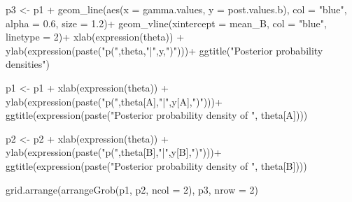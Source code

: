 \documentclass[
  11pt,
]{article}
\newenvironment{Shaded}{\begin{snugshade}}{\end{snugshade}}
\newcommand{\AttributeTok}[1]{\textcolor[rgb]{0.77,0.63,0.00}{#1}}
\newcommand{\DecValTok}[1]{\textcolor[rgb]{0.00,0.00,0.81}{#1}}
\newcommand{\FloatTok}[1]{\textcolor[rgb]{0.00,0.00,0.81}{#1}}
\newcommand{\FunctionTok}[1]{\textcolor[rgb]{0.00,0.00,0.00}{#1}}
\newcommand{\NormalTok}[1]{#1}
\newcommand{\OtherTok}[1]{\textcolor[rgb]{0.56,0.35,0.01}{#1}}
\newcommand{\SpecialCharTok}[1]{\textcolor[rgb]{0.00,0.00,0.00}{#1}}
\newcommand{\StringTok}[1]{\textcolor[rgb]{0.31,0.60,0.02}{#1}}
\begin{document}
\begin{Shaded}
\begin{Highlighting}[]
\NormalTok{p3 }\OtherTok{\textless{}{-}}\NormalTok{ p1 }\SpecialCharTok{+} 
  \FunctionTok{geom\_line}\NormalTok{(}\FunctionTok{aes}\NormalTok{(}\AttributeTok{x =}\NormalTok{ gamma.values, }\AttributeTok{y =}\NormalTok{ post.values.b), }\AttributeTok{col =} \StringTok{"blue"}\NormalTok{, }\AttributeTok{alpha =} \FloatTok{0.6}\NormalTok{, }\AttributeTok{size =} \FloatTok{1.2}\NormalTok{)}\SpecialCharTok{+}
  \FunctionTok{geom\_vline}\NormalTok{(}\AttributeTok{xintercept =}\NormalTok{ mean\_B, }\AttributeTok{col =} \StringTok{"blue"}\NormalTok{, }\AttributeTok{linetype =} \DecValTok{2}\NormalTok{)}\SpecialCharTok{+}
  \FunctionTok{xlab}\NormalTok{(}\FunctionTok{expression}\NormalTok{(theta)) }\SpecialCharTok{+}
  \FunctionTok{ylab}\NormalTok{(}\FunctionTok{expression}\NormalTok{(}\FunctionTok{paste}\NormalTok{(}\StringTok{"p("}\NormalTok{,theta,}\StringTok{"|"}\NormalTok{,y,}\StringTok{")"}\NormalTok{)))}\SpecialCharTok{+}
  \FunctionTok{ggtitle}\NormalTok{(}\StringTok{"Posterior probability densities"}\NormalTok{)  }

\NormalTok{p1 }\OtherTok{\textless{}{-}}\NormalTok{ p1 }\SpecialCharTok{+}
  \FunctionTok{xlab}\NormalTok{(}\FunctionTok{expression}\NormalTok{(theta)) }\SpecialCharTok{+}
  \FunctionTok{ylab}\NormalTok{(}\FunctionTok{expression}\NormalTok{(}\FunctionTok{paste}\NormalTok{(}\StringTok{"p("}\NormalTok{,theta[A],}\StringTok{"|"}\NormalTok{,y[A],}\StringTok{")"}\NormalTok{)))}\SpecialCharTok{+}
  \FunctionTok{ggtitle}\NormalTok{(}\FunctionTok{expression}\NormalTok{(}\FunctionTok{paste}\NormalTok{(}\StringTok{"Posterior probability density of "}\NormalTok{, theta[A])))}

\NormalTok{p2 }\OtherTok{\textless{}{-}}\NormalTok{ p2 }\SpecialCharTok{+} 
  \FunctionTok{xlab}\NormalTok{(}\FunctionTok{expression}\NormalTok{(theta)) }\SpecialCharTok{+}
  \FunctionTok{ylab}\NormalTok{(}\FunctionTok{expression}\NormalTok{(}\FunctionTok{paste}\NormalTok{(}\StringTok{"p("}\NormalTok{,theta[B],}\StringTok{"|"}\NormalTok{,y[B],}\StringTok{")"}\NormalTok{)))}\SpecialCharTok{+}
  \FunctionTok{ggtitle}\NormalTok{(}\FunctionTok{expression}\NormalTok{(}\FunctionTok{paste}\NormalTok{(}\StringTok{"Posterior probability density of "}\NormalTok{, theta[B])))}

\FunctionTok{grid.arrange}\NormalTok{(}\FunctionTok{arrangeGrob}\NormalTok{(p1, p2, }\AttributeTok{ncol =} \DecValTok{2}\NormalTok{), p3, }\AttributeTok{nrow =} \DecValTok{2}\NormalTok{)}
\end{Highlighting}
\end{Shaded}
\end{document}
